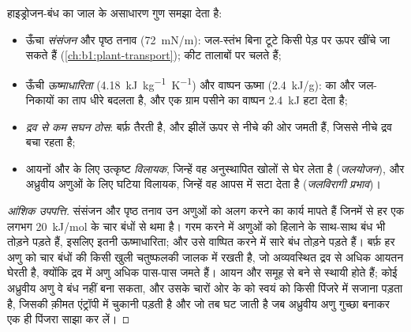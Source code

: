 \begin{proposition}[जल के वे गुण जो जीवन के लिए मायने रखते हैं]\label{prop:b1:water-small-molecules:properties}
हाइड्रोजन-बंध का जाल  के असाधारण गुण समझा देता है:
\begin{itemize}
  \item ऊँचा \emph{संसंजन} और पृष्ठ तनाव (\qty{72}{mN/m}): जल-स्तंभ
        बिना टूटे किसी पेड़ पर ऊपर खींचे जा सकते हैं
        (\cref{ch:b1:plant-transport}); कीट तालाबों पर चलते हैं;
  \item ऊँची \emph{ऊष्माधारिता} (\qty{4.18}{kJ.kg^{-1}.K^{-1}}) और
        वाष्पन ऊष्मा (\qty{2.4}{kJ/g}):  का और जल-निकायों का ताप
        धीरे बदलता है, और एक ग्राम पसीने का वाष्पन \qty{2.4}{kJ} हटा
        देता है;
  \item \emph{द्रव से कम सघन ठोस}: बर्फ़ तैरती है, और झीलें ऊपर से
        नीचे की ओर जमती हैं, जिससे नीचे द्रव  बचा रहता है;
  \item आयनों और  के लिए उत्कृष्ट \emph{विलायक}, जिन्हें वह
        अनुस्थापित खोलों से घेर लेता है (\emph{जलयोजन}), और अध्रुवीय
        अणुओं के लिए घटिया विलायक, जिन्हें वह आपस में सटा देता है
        (\emph{जलविरागी प्रभाव})।
\end{itemize}
\end{proposition}
\begin{proof}[आंशिक उपपत्ति]
संसंजन और पृष्ठ तनाव उन अणुओं को अलग करने का कार्य मापते हैं जिनमें से हर
एक लगभग \qty{20}{kJ/mol} के चार बंधों से थमा है।  गरम करने में अणुओं
को हिलाने के साथ-साथ बंध भी तोड़ने पड़ते हैं, इसलिए इतनी ऊष्माधारिता; और
उसे वाष्पित करने में सारे बंध तोड़ने पड़ते हैं। बर्फ़ हर अणु को चार
बंधों की किसी खुली चतुष्फलकी जालक में रखती है, जो अव्यवस्थित द्रव से अधिक
आयतन घेरती है, क्योंकि द्रव में अणु अधिक पास-पास जमते हैं। आयन और
 समूह  से बने  से स्थायी होते हैं; कोई अध्रुवीय
अणु वे बंध नहीं बना सकता, और उसके चारों ओर के  को स्वयं को किसी पिंजरे
में सजाना पड़ता है, जिसकी क़ीमत एंट्रॉपी में चुकानी पड़ती है और जो तब घट
जाती है जब अध्रुवीय अणु गुच्छा बनाकर एक ही पिंजरा साझा कर लें।
\end{proof}

